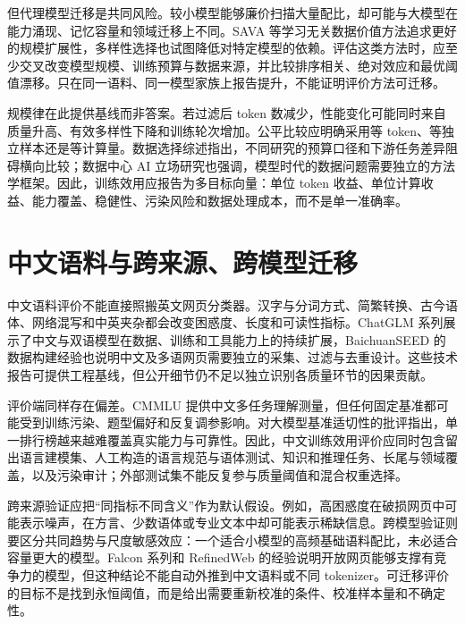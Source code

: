 \documentclass[11pt,a4paper]{article}
\begin{document}
但代理模型迁移是共同风险。较小模型能够廉价扫描大量配比，却可能与大模型在能力涌现、记忆容量和领域迁移上不同。SAVA 等学习无关数据价值方法追求更好的规模扩展性\cite{savascalablelearning2024}，多样性选择也试图降低对特定模型的依赖\cite{harnessingdiversityfor2024}。评估这类方法时，应至少交叉改变模型规模、训练预算与数据来源，并比较排序相关、绝对效应和最优阈值漂移。只在同一语料、同一模型家族上报告提升，不能证明评价方法可迁移。

规模律在此提供基线而非答案。若过滤后 token 数减少，性能变化可能同时来自质量升高、有效多样性下降和训练轮次增加。公平比较应明确采用等 token、等独立样本还是等计算量。数据选择综述指出，不同研究的预算口径和下游任务差异阻碍横向比较\cite{asurveyon2024}；数据中心 AI 立场研究也强调，模型时代的数据问题需要独立的方法学框架\cite{positionpaperdata2024}。因此，训练效用应报告为多目标向量：单位 token 收益、单位计算收益、能力覆盖、稳健性、污染风险和数据处理成本，而不是单一准确率。

\section{中文语料与跨来源、跨模型迁移}

中文语料评价不能直接照搬英文网页分类器。汉字与分词方式、简繁转换、古今语体、网络混写和中英夹杂都会改变困惑度、长度和可读性指标。ChatGLM 系列展示了中文与双语模型在数据、训练和工具能力上的持续扩展\cite{chatglmafamily2024}，BaichuanSEED 的数据构建经验也说明中文及多语网页需要独立的采集、过滤与去重设计\cite{baichuanseedsharingthe2024}。这些技术报告可提供工程基线，但公开细节仍不足以独立识别各质量环节的因果贡献。

评价端同样存在偏差。CMMLU 提供中文多任务理解测量\cite{cmmlumeasuringmassive2024}，但任何固定基准都可能受到训练污染、题型偏好和反复调参影响。对大模型基准适切性的批评指出，单一排行榜越来越难覆盖真实能力与可靠性\cite{inadequaciesoflarge2024}。因此，中文训练效用评价应同时包含留出语言建模集、人工构造的语言规范与语体测试、知识和推理任务、长尾与领域覆盖，以及污染审计；外部测试集不能反复参与质量阈值和混合权重选择。

跨来源验证应把“同指标不同含义”作为默认假设。例如，高困惑度在破损网页中可能表示噪声，在方言、少数语体或专业文本中却可能表示稀缺信息。跨模型验证则要区分共同趋势与尺度敏感效应：一个适合小模型的高频基础语料配比，未必适合容量更大的模型。Falcon 系列和 RefinedWeb 的经验说明开放网页能够支撑有竞争力的模型\cite{thefalconseries2023}，但这种结论不能自动外推到中文语料或不同 tokenizer。可迁移评价的目标不是找到永恒阈值，而是给出需要重新校准的条件、校准样本量和不确定性。
\end{document}
